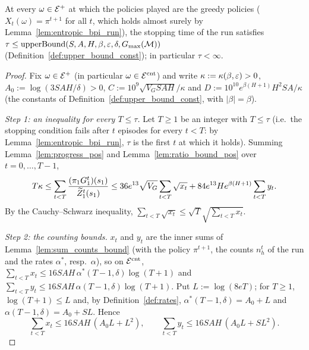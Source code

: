 \begin{lemma}\label{lem:stopping_time_bound_pos}
\leanok
{}
At every $\omega \in \mathcal{E}^+$ at which the policies played are the greedy policies
($X_t(\omega) = \pi^{t+1}$ for all $t$, which holds almost surely by Lemma~\ref{lem:entropic_bpi_run}),
the stopping time of the run satisfies
$\tau \le \mathrm{upperBound}(S, A, H, \beta, \varepsilon, \delta, G_{\max}(\mathcal M))$ (Definition~\ref{def:upper_bound_const});
in particular $\tau < \infty$.
\end{lemma}

\begin{proof}
\leanok
Fix $\omega \in \mathcal{E}^+$ (in particular $\omega \in \mathcal{E}^{\mathrm{cnt}}$) and write $\kappa := \kappa(\beta,\varepsilon) > 0$,
$A_0 := \log(3SAH/\delta) > 0$, $C := 10^9\sqrt{V_G SAH}/\kappa$ and $D := 10^{10}e^{\beta(H+1)}H^2SA/\kappa$ (the
constants of Definition~\ref{def:upper_bound_const}, with $|\beta| = \beta$).

\emph{Step 1: an inequality for every $T \le \tau$.} Let $T \ge 1$ be an integer with $T \le \tau$
(i.e.\ the stopping condition fails after $t$ episodes for every $t < T$: by
Lemma~\ref{lem:entropic_bpi_run}, $\tau$ is the first $t$ at which it holds). Summing
Lemma~\ref{lem:progress_pos} and Lemma~\ref{lem:ratio_bound_pos} over $t = 0, \dots, T - 1$,
\[
  T\kappa \le \sum_{t < T}\frac{(\pi_1G_1^t)(s_1)}{\widetilde{Z}_1^t(s_1)}
  \le 36e^{13}\sqrt{V_G}\sum_{t < T}\sqrt{x_t} + 84e^{13}He^{\beta(H+1)}\sum_{t < T}y_t .
\]
By the Cauchy--Schwarz inequality, $\sum_{t < T}\sqrt{x_t} \le \sqrt{T}\sqrt{\sum_{t < T}x_t}$.

\emph{Step 2: the counting bounds.} $x_t$ and $y_t$ are the inner sums of
Lemma~\ref{lem:sum_counts_bound} (with the policy $\pi^{t+1}$, the counts $n_h^t$ of the run and the
rates $\alpha^*$, resp.\ $\alpha$), so on $\mathcal{E}^{\mathrm{cnt}}$,
$\sum_{t < T}x_t \le 16SAH\,\alpha^*(T-1,\delta)\log(T+1)$ and $\sum_{t < T}y_t \le 16SAH\,\alpha(T-1,\delta)\log(T+1)$.
Put $L := \log(8eT)$; for $T \ge 1$, $\log(T+1) \le L$ and, by Definition~\ref{def:rates},
$\alpha^*(T-1,\delta) = A_0 + L$ and $\alpha(T-1,\delta) = A_0 + SL$. Hence
\[
  \sum_{t < T}x_t \le 16SAH\,(A_0L + L^2), \qquad \sum_{t < T}y_t \le 16SAH\,(A_0L + SL^2) .
\]


\end{proof}
